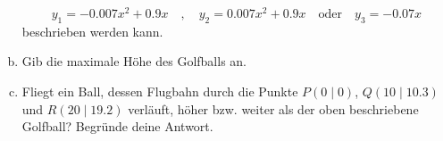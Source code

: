 \begin{exercise}
\begin{enumerate}[a)]
\begin{equation*}
                y_1=\num{-0.007}x^2+\num{0.9}x
                \quad,\quad
                y_2=\num{0.007}x^2+\num{0.9}x
                \quad\text{oder}\quad
                y_3=\num{-0.07}x
            \end{equation*}
            beschrieben werden kann.
      \item Gib die maximale Höhe des Golfballs an.
      \item Fliegt ein Ball, dessen Flugbahn durch die Punkte
            $P(0\mid0)$, $Q(10\mid\num{10.3})$ und $R(20\mid\num{19.2})$
            verläuft, höher bzw. weiter als der oben beschriebene Golfball?
            Begründe deine Antwort.
    \end{enumerate}
  \fi
\end{exercise}
